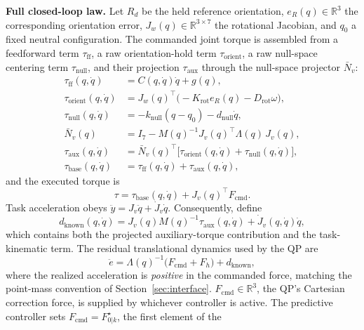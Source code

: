 \documentclass[journal]{IEEEtran}
\begin{document}
\noindent\textbf{Full closed-loop law.} Let $R_d$ be the held reference
orientation, $e_R(q)\in\mathbb R^3$ the corresponding orientation error,
$J_w(q)\in\mathbb R^{3\times7}$ the rotational Jacobian, and $q_0$ a
fixed neutral configuration. The commanded joint torque is assembled
from a feedforward term $\tau_{\mathrm{ff}}$, a raw orientation-hold
term $\tau_{\mathrm{orient}}$, a raw null-space centering term
$\tau_{\mathrm{null}}$, and their projection $\tau_{\mathrm{aux}}$
through the null-space projector $\bar N_v$:
\begin{equation}
\begin{aligned}
\tau_{\mathrm{ff}}(q,\dot q)&=C(q,\dot q)\dot q+g(q),\\
\tau_{\mathrm{orient}}(q,\dot q)&=J_w(q)^\top\bigl(-K_{\mathrm{rot}}e_R(q)-D_{\mathrm{rot}}\omega\bigr),\\
\tau_{\mathrm{null}}(q,\dot q)&=-k_{\mathrm{null}}(q-q_0)-d_{\mathrm{null}}\dot q,\\
\bar N_v(q)&=I_7-M(q)^{-1}J_v(q)^\top\Lambda(q)\,J_v(q),\\
\tau_{\mathrm{aux}}(q,\dot q)&=\bar N_v(q)^\top\bigl[\tau_{\mathrm{orient}}(q,\dot q)+\tau_{\mathrm{null}}(q,\dot q)\bigr],\\
\tau_{\mathrm{base}}(q,\dot q)&=\tau_{\mathrm{ff}}(q,\dot q)+\tau_{\mathrm{aux}}(q,\dot q),
\end{aligned}
\end{equation}
and the executed torque is
\begin{equation}
\tau=\tau_{\mathrm{base}}(q,\dot q)+J_v(q)^\top F_{\mathrm{cmd}}.
\end{equation}
Task acceleration obeys $\ddot y=J_v\ddot q+\dot J_v\dot q$. Consequently,
define
\begin{equation}
d_{\mathrm{known}}(q,\dot q) =J_v(q)M(q)^{-1}\tau_{\mathrm{aux}}(q,\dot q)
+\dot J_v(q,\dot q)\dot q,
\end{equation}
which contains both the projected auxiliary-torque contribution and the
task-kinematic term. The residual translational dynamics used by the QP
are
\begin{equation}
\ddot e=\Lambda(q)^{-1}\bigl(F_{\mathrm{cmd}}+F_h\bigr)+d_{\mathrm{known}},
\end{equation}
where the realized acceleration is \emph{positive} in the commanded
force, matching the point-mass convention of Section~\ref{sec:interface}.
$F_{\mathrm{cmd}}\in\mathbb R^3$, the QP's Cartesian correction force, is
supplied by whichever controller is active. The predictive controller
sets $F_{\mathrm{cmd}}=F_{0|k}^\star$, the first element of the
\end{document}
